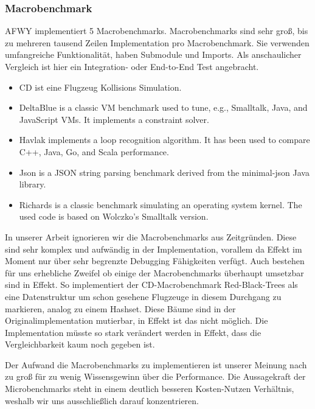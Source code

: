 \subsubsection{Macrobenchmark}
AFWY implementiert 5 Macrobenchmarks. 
Macrobenchmarks sind sehr groß, bis zu mehreren tausend Zeilen Implementation pro Macrobenchmark. Sie verwenden umfangreiche Funktionalität, haben Submodule und Imports. Als anschaulicher Vergleich ist hier ein Integration- oder End-to-End Test angebracht.

\begin{itemize}
\item CD ist eine Flugzeug Kollisions Simulation. 
\item DeltaBlue is a classic VM benchmark used to tune, e.g., Smalltalk, Java, and JavaScript VMs. It implements a constraint solver.
\item Havlak implements a loop recognition algorithm. It has been used to compare C++, Java, Go, and Scala performance.
\item Json is a JSON string parsing benchmark derived from the minimal-json Java library.
\item Richards is a classic benchmark simulating an operating system kernel. The used code is based on Wolczko's Smalltalk version.
\end{itemize}

In unserer Arbeit ignorieren wir die Macrobenchmarks aus Zeitgründen. Diese sind sehr komplex und aufwändig in der Implementation, vorallem da Effekt im Moment nur über sehr begrenzte Debugging Fähigkeiten verfügt. Auch bestehen für uns erhebliche Zweifel ob einige der Macrobenchmarks überhaupt umsetzbar sind in Effekt. So implementiert der CD-Macrobenchmark Red-Black-Trees als eine Datenstruktur um schon gesehene Flugzeuge in diesem Durchgang zu markieren, analog zu einem Hashset.
Diese Bäume sind in der Originalimplementation mutierbar, in Effekt ist das nicht möglich. Die Implementation müsste so stark verändert werden in Effekt, dass die Vergleichbarkeit kaum noch gegeben ist.

Der Aufwand die Macrobenchmarks zu implementieren ist unserer Meinung nach zu groß für zu wenig Wissensgewinn über die Performance.
Die Aussagekraft der Microbenchmarks steht in einem deutlich besseren Kosten-Nutzen Verhältnis, weshalb wir uns ausschließlich darauf konzentrieren.

